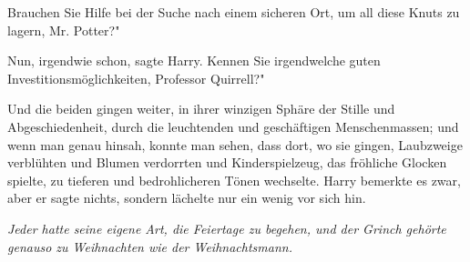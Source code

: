 \glqq{}Brauchen Sie Hilfe bei der Suche nach einem sicheren Ort, um all diese
Knuts zu lagern, Mr. Potter?"

\glqq{}Nun, irgendwie schon\grqq{}, sagte Harry. \glqq{}Kennen Sie irgendwelche
guten Investitionsmöglichkeiten, Professor Quirrell?"

Und die beiden gingen weiter, in ihrer winzigen Sphäre der Stille und
Abgeschiedenheit, durch die leuchtenden und geschäftigen Menschenmassen; und
wenn man genau hinsah, konnte man sehen, dass dort, wo sie gingen, Laubzweige
verblühten und Blumen verdorrten und Kinderspielzeug, das fröhliche Glocken
spielte, zu tieferen und bedrohlicheren Tönen wechselte. Harry bemerkte es zwar,
aber er sagte nichts, sondern lächelte nur ein wenig vor sich hin.

\emph{Jeder hatte seine eigene Art, die Feiertage zu begehen, und der Grinch
gehörte genauso zu Weihnachten wie der Weihnachtsmann.}

